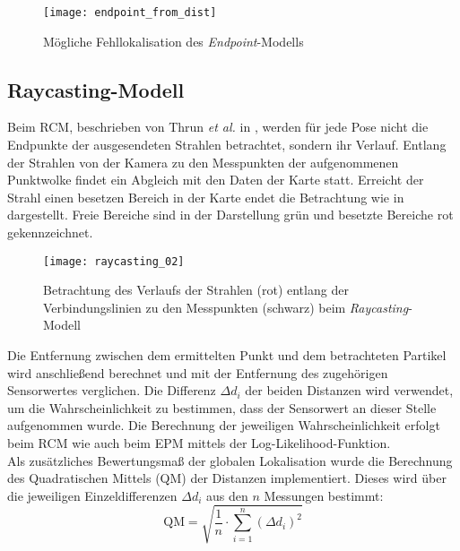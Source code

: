 \begin{figure}[!ht]
	\begin{center}
		\texttt{[image: endpoint\_from\_dist]}
		\caption{Mögliche Fehllokalisation des \textit{Endpoint}-Modells}
		\label{fig.endpoint}
	\end{center}
\end{figure}

\subsection{Raycasting-Modell}
Beim RCM, beschrieben von Thrun \textit{et al.} in \cite{Thrun2005}, werden für jede Pose nicht die Endpunkte der ausgesendeten Strahlen betrachtet, sondern ihr Verlauf. Entlang der Strahlen von der Kamera zu den Messpunkten der aufgenommenen Punktwolke findet ein Abgleich mit den Daten der Karte statt. Erreicht der Strahl einen besetzen Bereich in der Karte endet die Betrachtung wie in  dargestellt. Freie Bereiche sind in der Darstellung grün und besetzte Bereiche rot gekennzeichnet.\\

\begin{figure}[!ht]
	\begin{center}
		\texttt{[image: raycasting\_02]}
		\caption{Betrachtung des Verlaufs der Strahlen (rot) entlang der Verbindungslinien zu den Messpunkten (schwarz) beim \textit{Raycasting}-Modell}
		\label{fig.raycast}
	\end{center}
\end{figure}

\prever{
}
Die Entfernung zwischen dem ermittelten Punkt und dem betrachteten Partikel wird anschließend berechnet und mit der Entfernung des zugehörigen Sensorwertes verglichen. Die Differenz ${\Delta d}_i$ der beiden Distanzen wird verwendet, um die Wahrscheinlichkeit zu bestimmen, dass der Sensorwert an dieser Stelle aufgenommen wurde. Die Berechnung der jeweiligen Wahrscheinlichkeit erfolgt beim RCM wie auch beim EPM mittels der Log-Likelihood-Funktion.\\

Als zusätzliches Bewertungsmaß der globalen Lokalisation wurde die Berechnung des Quadratischen Mittels (QM) der Distanzen implementiert. Dieses wird über die jeweiligen Einzeldifferenzen ${\Delta d}_i$ aus den $n$ Messungen bestimmt:
%
\begin{equation}
\mathrm{QM} = \sqrt{\frac{1}{n} \cdot \sum_{i=1}^n{({\Delta d}_i)^2}}
\end{equation}

